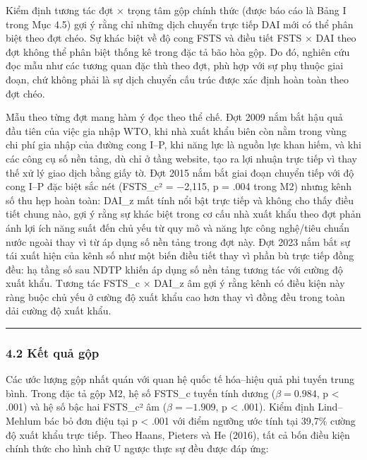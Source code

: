 \documentclass[12pt,a4paper]{article}
\begin{document}
Kiểm định tương tác đợt × trọng tâm gộp chính thức (được báo cáo là Bảng
I trong Mục 4.5) gợi ý rằng chỉ những dịch chuyển trực tiếp DAI mới có
thể phân biệt theo đợt chéo. Sự khác biệt về độ cong FSTS và điều tiết
FSTS × DAI theo đợt không thể phân biệt thống kê trong đặc tả bão hòa
gộp. Do đó, nghiên cứu đọc mẫu như các tương quan đặc thù theo đợt, phù
hợp với sự phụ thuộc giai đoạn, chứ không phải là sự dịch chuyển cấu
trúc được xác định hoàn toàn theo đợt chéo.

Mẫu theo từng đợt mang hàm ý đọc theo thể chế. Đợt 2009 nắm bắt hậu quả
đầu tiên của việc gia nhập WTO, khi nhà xuất khẩu biên còn nằm trong
vùng chi phí gia nhập của đường cong I--P, khi năng lực là nguồn lực
khan hiếm, và khi các công cụ số nền tảng, dù chỉ ở tầng website, tạo ra
lợi nhuận trực tiếp vì thay thế xử lý giao dịch bằng giấy tờ. Đợt 2015
nắm bắt giai đoạn chuyển tiếp với độ cong I--P đặc biệt sắc nét
(FSTS\_c² = −2,115, p = .004 trong M2) nhưng kênh số thu hẹp hoàn toàn:
DAI\_z mất tính nổi bật trực tiếp và không cho thấy điều tiết chung nào,
gợi ý rằng sự khác biệt trong cơ cấu nhà xuất khẩu theo đợt phản ánh lợi
ích năng suất đến chủ yếu từ quy mô và năng lực công nghệ/tiêu chuẩn
nước ngoài thay vì từ áp dụng số nền tảng trong đợt này. Đợt 2023 nắm
bắt sự tái xuất hiện của kênh số như một biến điều tiết thay vì phần bù
trực tiếp đồng đều: hạ tầng số sau NDTP khiến áp dụng số nền tảng tương
tác với cường độ xuất khẩu. Tương tác FSTS\_c × DAI\_z âm gợi ý rằng
kênh có điều kiện này ràng buộc chủ yếu ở cường độ xuất khẩu cao hơn
thay vì đồng đều trong toàn dải cường độ xuất khẩu.

\begin{center}\rule{0.5\linewidth}{0.5pt}\end{center}

\hypertarget{42-kux1ebft-quux1ea3-gux1ed9p}{%
\subsubsection{4.2 Kết quả gộp}\label{42-kux1ebft-quux1ea3-gux1ed9p}}

Các ước lượng gộp nhất quán với quan hệ quốc tế hóa--hiệu quả phi tuyến
trung bình. Trong đặc tả gộp M2, hệ số FSTS\_c tuyến tính dương
(\(\beta = 0.984\), p \textless{} .001) và hệ số bậc hai FSTS\_c² âm
(\(\beta = −1.909\), p \textless{} .001). Kiểm định Lind--Mehlum bác bỏ
đơn điệu tại p \textless{} .001 với điểm ngưỡng ước tính tại 39,7\%
cường độ xuất khẩu trực tiếp. Theo Haans, Pieters và He (2016), tất cả
bốn điều kiện chính thức cho hình chữ U ngược thực sự đều được đáp ứng:
\end{document}
